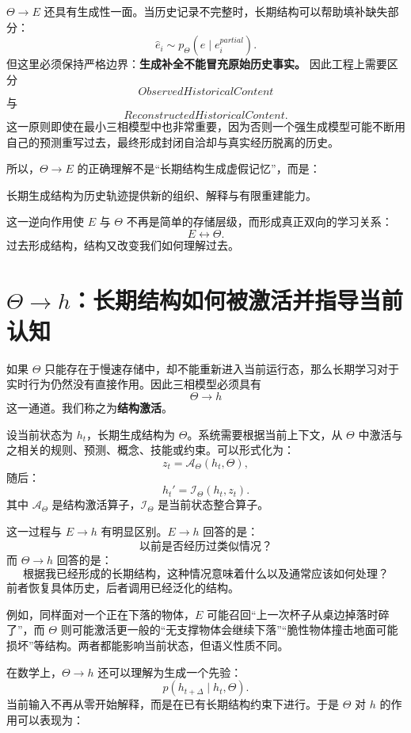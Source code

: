 $\Theta\rightarrow E$ 还具有生成性一面。当历史记录不完整时，长期结构可以帮助填补缺失部分：
\[
\hat e_i
\sim
p_\Theta(e\mid e_i^{partial}).
\]
但这里必须保持严格边界：\textbf{生成补全不能冒充原始历史事实。} 因此工程上需要区分
\[
ObservedHistoricalContent
\]
与
\[
ReconstructedHistoricalContent.
\]
这一原则即使在最小三相模型中也非常重要，因为否则一个强生成模型可能不断用自己的预测重写过去，最终形成封闭自洽却与真实经历脱离的历史。

所以，$\Theta\rightarrow E$ 的正确理解不是“长期结构生成虚假记忆”，而是：
\begin{statementbox}
长期生成结构为历史轨迹提供新的组织、解释与有限重建能力。
\end{statementbox}
这一逆向作用使 $E$ 与 $\Theta$ 不再是简单的存储层级，而形成真正双向的学习关系：
\[
E
\leftrightarrow
\Theta.
\]
过去形成结构，结构又改变我们如何理解过去。

\section{$\Theta\rightarrow h$：长期结构如何被激活并指导当前认知}

如果 $\Theta$ 只能存在于慢速存储中，却不能重新进入当前运行态，那么长期学习对于实时行为仍然没有直接作用。因此三相模型必须具有
\[
\boxed{
\Theta\rightarrow h
}
\]
这一通道。我们称之为\textbf{结构激活}。

设当前状态为 $h_t$，长期生成结构为 $\Theta$。系统需要根据当前上下文，从 $\Theta$ 中激活与之相关的规则、预测、概念、技能或约束。可以形式化为：
\[
z_t
=
\mathcal A_\Theta
\left(
h_t,\Theta
\right),
\]
随后：
\[
h_t'
=
\mathcal I_\Theta
\left(
h_t,z_t
\right).
\]
其中 $\mathcal A_\Theta$ 是结构激活算子，$\mathcal I_\Theta$ 是当前状态整合算子。

这一过程与 $E\rightarrow h$ 有明显区别。$E\rightarrow h$ 回答的是：
\[
\text{以前是否经历过类似情况？}
\]
而 $\Theta\rightarrow h$ 回答的是：
\[
\text{根据我已经形成的长期结构，这种情况意味着什么以及通常应该如何处理？}
\]
前者恢复具体历史，后者调用已经泛化的结构。

例如，同样面对一个正在下落的物体，$E$ 可能召回“上一次杯子从桌边掉落时碎了”，而 $\Theta$ 则可能激活更一般的“无支撑物体会继续下落”“脆性物体撞击地面可能损坏”等结构。两者都能影响当前状态，但语义性质不同。

在数学上，$\Theta\rightarrow h$ 还可以理解为生成一个先验：
\[
p(h_{t+\Delta}\mid h_t,\Theta).
\]
当前输入不再从零开始解释，而是在已有长期结构约束下进行。于是 $\Theta$ 对 $h$ 的作用可以表现为：
\begin{statementbox}
\centering
{}
\end{statementbox}

